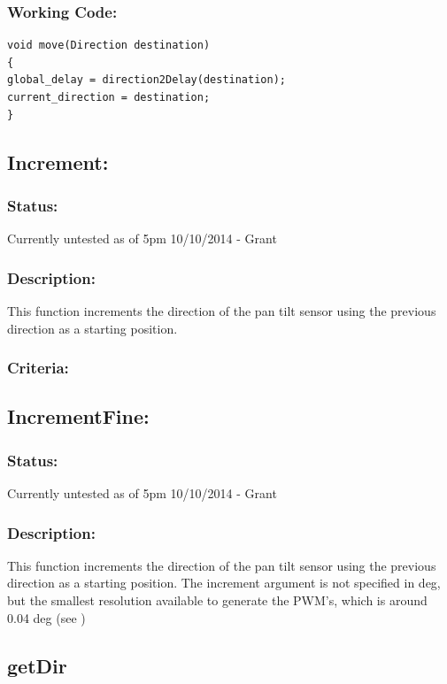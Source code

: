 \documentclass[]{report}
\begin{document}
\subsubsection{Working Code:}
\begin{lstlisting}
void move(Direction destination)
{
global_delay = direction2Delay(destination);
current_direction = destination;
}
\end{lstlisting}

\subsection{Increment:}
\subsubsection{Status:}
Currently untested as of 5pm 10/10/2014 - Grant

\subsubsection{Description:}
This function increments the direction of the pan tilt sensor using the previous direction as a starting position.

\subsubsection{Criteria:}

\subsection{IncrementFine:}
\subsubsection{Status:}
Currently untested as of 5pm 10/10/2014 - Grant

\subsubsection{Description:}
This function increments the direction of the pan tilt sensor using the previous direction as a starting position. The increment argument is not specified in deg, but the smallest resolution available to generate the PWM's, which is around 0.04 deg (see )

\subsection{getDir}
\end{document}
